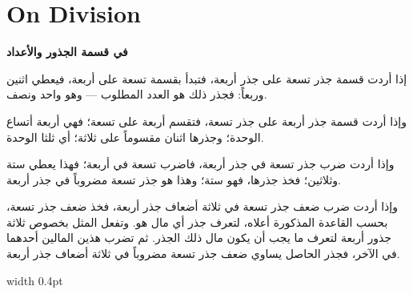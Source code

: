 \documentclass[11pt,a4paper,openany,oneside]{book}
\begin{document}
\chapter{On Division}
\label{ch:division}

\noindent\begin{minipage}[t]{0.48\textwidth}
\raggedleft

\begin{Arabic}
\textbf{في قسمة الجذور والأعداد}

إذا أردت قسمة جذر تسعة على جذر أربعة، فتبدأ بقسمة تسعة على أربعة، فيعطي اثنين وربعاً: فجذر ذلك هو العدد المطلوب — وهو واحد ونصف.

وإذا أردت قسمة جذر أربعة على جذر تسعة، فتقسم أربعة على تسعة؛ فهي أربعة أتساع الوحدة؛ وجذرها اثنان مقسوماً على ثلاثة؛ أي ثلثا الوحدة.

وإذا أردت ضرب جذر تسعة في جذر أربعة، فاضرب تسعة في أربعة؛ فهذا يعطي ستة وثلاثين؛ فخذ جذرها، فهو ستة؛ وهذا هو جذر تسعة مضروباً في جذر أربعة.

وإذا أردت ضرب ضعف جذر تسعة في ثلاثة أضعاف جذر أربعة، فخذ ضعف جذر تسعة، بحسب القاعدة المذكورة أعلاه، لتعرف جذر أي مال هو. وتفعل المثل بخصوص ثلاثة جذور أربعة لتعرف ما يجب أن يكون مال ذلك الجذر. ثم تضرب هذين المالين أحدهما في الآخر، فجذر الحاصل يساوي ضعف جذر تسعة مضروباً في ثلاثة أضعاف جذر أربعة.
\end{Arabic}

\end{minipage}%
\hfill\vrule width 0.4pt\hfill
\end{document}
